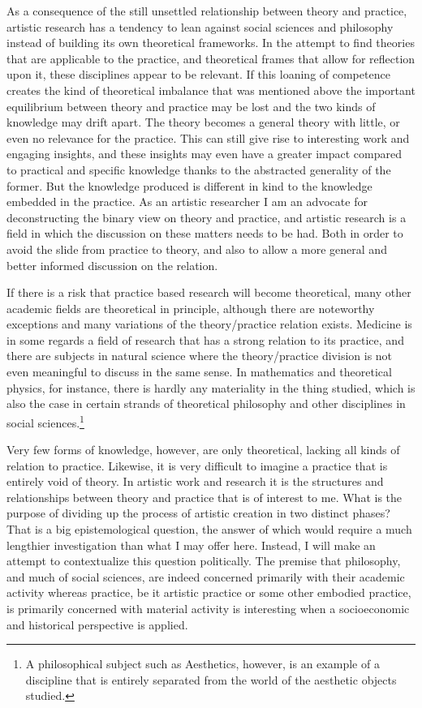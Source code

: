 \documentclass[12pt]{article}
\begin{document}
As a consequence of the still unsettled relationship between theory and practice, artistic research has a tendency to lean against social sciences and philosophy instead of building its own theoretical frameworks. In the attempt to find theories that are applicable to the practice, and theoretical frames that allow for reflection upon it, these disciplines appear to be relevant. If this loaning of competence creates the kind of theoretical imbalance that was mentioned above the important equilibrium between theory and practice may be lost and the two kinds of knowledge may drift apart. The theory becomes a general theory with little, or even no relevance for the practice. This can still give rise to interesting work and engaging insights, and these insights may even have a greater impact compared to practical and specific knowledge thanks to the abstracted generality of the former. But the knowledge produced is different in kind to the knowledge embedded in the practice. As an artistic researcher I am an advocate for deconstructing the binary view on theory and practice, and artistic research is a field in which the discussion on these matters needs to be had. Both in order to avoid the slide from practice to theory, and also to allow a more general and better informed discussion on the relation. 

If there is a risk that practice based research will become theoretical, many other academic fields are theoretical in principle, although there are noteworthy exceptions and many variations of the theory/practice relation exists. Medicine is in some regards a field of research that has a strong relation to its practice, and there are subjects in natural science where the theory/practice division is not even meaningful to discuss in the same sense. In mathematics and theoretical physics, for instance, there is hardly any materiality in the thing studied, which is also the case in certain strands of theoretical philosophy and other disciplines in social sciences.\footnote{A philosophical subject such as Aesthetics, however, is an example of a discipline that is entirely separated from the world of the aesthetic objects studied.}

Very few forms of knowledge, however, are only theoretical, lacking all kinds of relation to practice. Likewise, it is very difficult to imagine a practice that is entirely void of theory. In artistic work and research it is the structures and relationships between theory and practice that is of interest to me. What is the purpose of dividing up the process of artistic creation in two distinct phases? That is a big epistemological question, the answer of which would require a much lengthier investigation than what I may offer here. Instead, I will make an attempt to contextualize this question politically. The premise that philosophy, and much of social sciences, are indeed concerned primarily with their academic activity whereas practice, be it artistic practice or some other embodied practice, is primarily concerned with material activity is interesting when a socioeconomic and historical perspective is applied.
\end{document}
